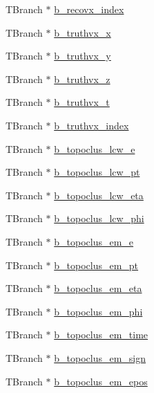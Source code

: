 \begin{DoxyCompactItemize}
T\+Branch $\ast$ \hyperlink{classXMLWriter_a4076363b847025a078823ae7dd9f7487}{b\+\_\+recovx\+\_\+index}
\item 
T\+Branch $\ast$ \hyperlink{classXMLWriter_a942e25478ef66a606a761e283c9eee64}{b\+\_\+truthvx\+\_\+x}
\item 
T\+Branch $\ast$ \hyperlink{classXMLWriter_a5b9880c8f63ac783d15d3063eaa4b1c8}{b\+\_\+truthvx\+\_\+y}
\item 
T\+Branch $\ast$ \hyperlink{classXMLWriter_a2822487cf5106852bbc32030912e3bb4}{b\+\_\+truthvx\+\_\+z}
\item 
T\+Branch $\ast$ \hyperlink{classXMLWriter_a259c9006231e12703411e12e38805039}{b\+\_\+truthvx\+\_\+t}
\item 
T\+Branch $\ast$ \hyperlink{classXMLWriter_afb0b124448336d69fc02d9a86c76b85a}{b\+\_\+truthvx\+\_\+index}
\item 
T\+Branch $\ast$ \hyperlink{classXMLWriter_a9b9c5f7be2d8f7f0844cc3724445d43b}{b\+\_\+topoclus\+\_\+lcw\+\_\+e}
\item 
T\+Branch $\ast$ \hyperlink{classXMLWriter_a4cf2a31c57c7fb454ed7bf1eb9476d82}{b\+\_\+topoclus\+\_\+lcw\+\_\+pt}
\item 
T\+Branch $\ast$ \hyperlink{classXMLWriter_a6612de8931956d67144e748b8472aadb}{b\+\_\+topoclus\+\_\+lcw\+\_\+eta}
\item 
T\+Branch $\ast$ \hyperlink{classXMLWriter_a8aa61b3fd0418b5a544b79ceae890937}{b\+\_\+topoclus\+\_\+lcw\+\_\+phi}
\item 
T\+Branch $\ast$ \hyperlink{classXMLWriter_a0a803b2c68228584e3b4437490cf20e3}{b\+\_\+topoclus\+\_\+em\+\_\+e}
\item 
T\+Branch $\ast$ \hyperlink{classXMLWriter_ac2ae10f557224815e918f3a9ee0992d3}{b\+\_\+topoclus\+\_\+em\+\_\+pt}
\item 
T\+Branch $\ast$ \hyperlink{classXMLWriter_af59b79d7afc774a17bb06f9244317e9f}{b\+\_\+topoclus\+\_\+em\+\_\+eta}
\item 
T\+Branch $\ast$ \hyperlink{classXMLWriter_a7db35b1f73e88d9b2950ce4bda745cc6}{b\+\_\+topoclus\+\_\+em\+\_\+phi}
\item 
T\+Branch $\ast$ \hyperlink{classXMLWriter_a19fa67969fd208c170c587dd141f5e52}{b\+\_\+topoclus\+\_\+em\+\_\+time}
\item 
T\+Branch $\ast$ \hyperlink{classXMLWriter_aac6a373f4339411c50c6baaee630b006}{b\+\_\+topoclus\+\_\+em\+\_\+sign}
\item 
T\+Branch $\ast$ \hyperlink{classXMLWriter_a08292d2d403715b7c25c91a51e32a350}{b\+\_\+topoclus\+\_\+em\+\_\+epos}
\item 

\end{DoxyCompactItemize}
